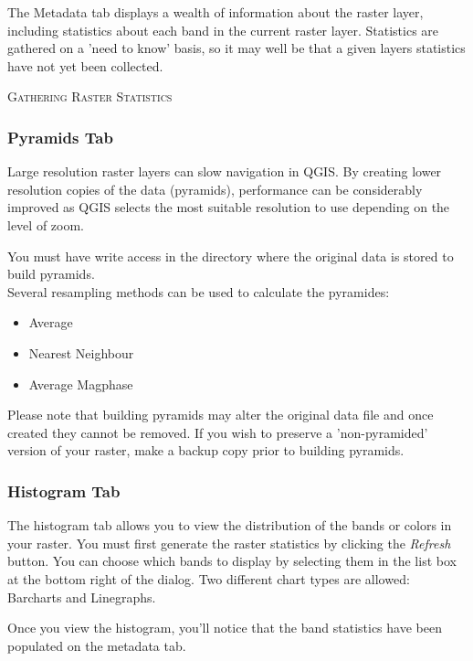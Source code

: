 The Metadata tab displays a wealth of information about the raster layer,
including statistics about each band in the current raster layer. Statistics
are gathered on a 'need to know' basis, so it may well be that a given layers
statistics have not yet been collected.


\begin{Tip}\caption{\textsc{Gathering Raster Statistics}}
\end{Tip}

\subsubsection{Pyramids Tab}\label{raster_pyramids}

Large resolution raster layers can slow navigation in QGIS. By creating lower
resolution copies of the data (pyramids), performance can be considerably
improved as QGIS selects the most suitable resolution to use depending on the
level of zoom.

You must have write access in the directory where the original data is stored
to build pyramids. \\
Several resampling methods can be used to calculate the pyramides:
\begin{itemize}
\item Average
\item Nearest Neighbour
\item Average Magphase
\end{itemize}

Please note that building pyramids may alter the original data file and once
created they cannot be removed. If you wish to preserve a 'non-pyramided'
version of your raster, make a backup copy prior to building pyramids.

\subsubsection{Histogram Tab}\label{raster_histogram}

The histogram tab allows you to view the distribution 
of the bands or colors in your raster. You must first generate the raster statistics 
by clicking the \textsl{Refresh} button. You can choose which bands to display by 
selecting them in the list box at the bottom right of the dialog. Two different
chart types are allowed: Barcharts and Linegraphs.

Once you view the histogram, you'll notice that the band statistics have been
populated on the metadata tab.

